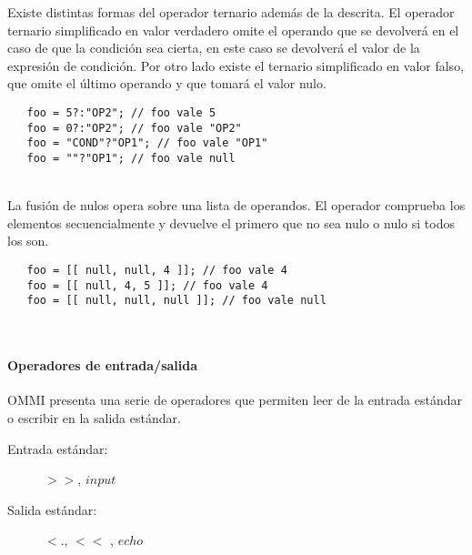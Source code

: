 Existe distintas formas del operador ternario además de la descrita. El operador ternario simplificado en valor verdadero omite el operando que se devolverá en el caso de que la condición 
sea cierta, en este caso se devolverá el valor de la expresión de condición. Por otro lado existe el ternario simplificado en valor falso, que omite el último operando
y que tomará el valor nulo. \\

\begin{lstlisting}
   foo = 5?:"OP2"; // foo vale 5
   foo = 0?:"OP2"; // foo vale "OP2"
   foo = "COND"?"OP1"; // foo vale "OP1"
   foo = ""?"OP1"; // foo vale null
\end{lstlisting} 
\hfill\\

La fusión de nulos opera sobre una lista de operandos. El operador comprueba los elementos secuencialmente y devuelve el primero que no sea nulo o nulo si todos los son. \\

\begin{lstlisting}
   foo = [[ null, null, 4 ]]; // foo vale 4
   foo = [[ null, 4, 5 ]]; // foo vale 4
   foo = [[ null, null, null ]]; // foo vale null
\end{lstlisting}
\hfill\\


\paragraph{Operadores de entrada/salida} \label{sec:op_io}
OMMI presenta una serie de operadores que permiten leer de la entrada estándar o
escribir en la salida estándar.

\begin{description}
\item [Entrada estándar:] $>>$, $input$
\item [Salida estándar:] $<.$, $<<$ , $echo$
\end{description} 

